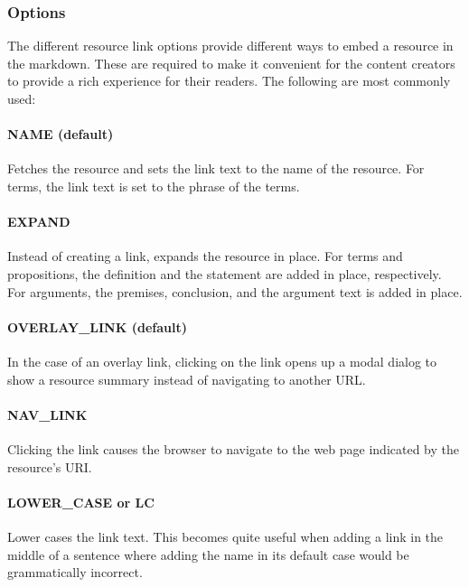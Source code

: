 \documentclass[a4paper]{article}
\begin{document}
\subsubsection{Options}

The different resource link options provide different ways to embed a resource in the markdown. These are required to make it convenient for the content creators to provide a rich experience for their readers. The following are most commonly used:


\paragraph{NAME (default)}

Fetches the resource and sets the link text to the name of the resource. For terms, the link text is set to the phrase of the terms.


\paragraph{EXPAND}

Instead of creating a link, expands the resource in place. For terms and propositions, the definition and the statement are added in place, respectively. For arguments, the premises, conclusion, and the argument text is added in place.


\paragraph{OVERLAY\_LINK (default)}

In the case of an overlay link, clicking on the link opens up a modal dialog to show a resource summary instead of navigating to another URL.


\paragraph{NAV\_LINK}

Clicking the link causes the browser to navigate to the web page indicated by the resource's URI.


\paragraph{LOWER\_CASE or LC}

Lower cases the link text. This becomes quite useful when adding a link in the middle of a sentence where adding the name in its default case would be grammatically incorrect.
\end{document}
